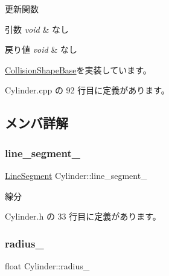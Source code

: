 更新関数 


\begin{DoxyParams}{引数}
{\em void} & なし \\
\hline
\end{DoxyParams}

\begin{DoxyRetVals}{戻り値}
{\em void} & なし \\
\hline
\end{DoxyRetVals}


\mbox{\hyperlink{class_collision_shape_base_a7aaa0f4de4e208f168f78e3445313929}{Collision\+Shape\+Base}}を実装しています。



 Cylinder.\+cpp の 92 行目に定義があります。



\subsection{メンバ詳解}
\mbox{\label{class_cylinder_a29d1c6c61863d19f617287da9474f1c4}} 
\subsubsection{\texorpdfstring{line\+\_\+segment\+\_\+}{line\_segment\_}}
{\footnotesize\ttfamily \mbox{\hyperlink{class_line_segment}{Line\+Segment}} Cylinder\+::line\+\_\+segment\+\_\+\hspace{0.3cm}{\ttfamily [private]}}



線分 



 Cylinder.\+h の 33 行目に定義があります。

\mbox{\label{class_cylinder_abba752e07b11b7bfd8fcce64a6d9b678}} 
\subsubsection{\texorpdfstring{radius\+\_\+}{radius\_}}
{\footnotesize\ttfamily float Cylinder\+::radius\+\_\+\hspace{0.3cm}{\ttfamily [private]}}



